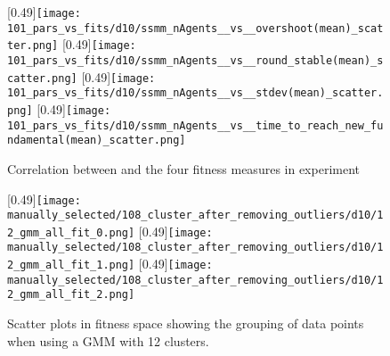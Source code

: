 \begin{figure}
	\centering
	[0.49\linewidth]{\texttt{[image: 101\_pars\_vs\_fits/d10/ssmm\_nAgents\_\_vs\_\_overshoot(mean)\_scatter.png]}}
	[0.49\linewidth]{\texttt{[image: 101\_pars\_vs\_fits/d10/ssmm\_nAgents\_\_vs\_\_round\_stable(mean)\_scatter.png]}}
	[0.49\linewidth]{\texttt{[image: 101\_pars\_vs\_fits/d10/ssmm\_nAgents\_\_vs\_\_stdev(mean)\_scatter.png]}}
	[0.49\linewidth]{\texttt{[image: 101\_pars\_vs\_fits/d10/ssmm\_nAgents\_\_vs\_\_time\_to\_reach\_new\_fundamental(mean)\_scatter.png]}}
	
	\caption{Correlation between \ssmmnAgents and the four fitness measures in experiment \dten}
	\label{fig:d10_parvfit_ssmmnAgents}
\end{figure}



\begin{figure}
	\centering
	\subcaptionbox{}[0.49\linewidth]{\texttt{[image: manually\_selected/108\_cluster\_after\_removing\_outliers/d10/12\_gmm\_all\_fit\_0.png]}}
	\subcaptionbox{}[0.49\linewidth]{\texttt{[image: manually\_selected/108\_cluster\_after\_removing\_outliers/d10/12\_gmm\_all\_fit\_1.png]}}
	\subcaptionbox{}[0.49\linewidth]{\texttt{[image: manually\_selected/108\_cluster\_after\_removing\_outliers/d10/12\_gmm\_all\_fit\_2.png]}}
	\caption{Scatter plots in fitness space showing the grouping of data points when using a GMM with 12 clusters.}
	\label{fig:d10_scatter_clusters}
\end{figure}


